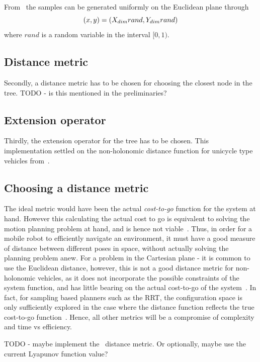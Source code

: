 From~\cite{kuffnerEffectiveSamplingDistance2004} the samples can be generated
uniformly on the Euclidean plane through
\[
  (x,y) = (\mathnormal{X}_{dim}rand, \mathnormal{Y}_{dim}rand)
\]
where \(rand\) is a random variable in the interval \([0,1)\).

\subsection{Distance metric}

Secondly, a distance metric has to be chosen for choosing the closest node in
the tree. TODO - is this mentioned in the preliminaries?

\subsection{Extension operator}

Thirdly, the extension operator for the tree has to be chosen. This
implementation settled on the non-holonomic distance function for unicycle type
vehicles from~\cite{parkFeedbackMotionPlanning2015}.

\subsection{Choosing a distance metric}

The ideal metric would have been the actual \textit{cost-to-go} function for the
system at hand. However this calculating the actual cost to go is equivalent to
solving the motion planning problem at hand, and is hence not
viable~\cite{pengchengReducingMetricSensitivity2001}. Thus, in order for a
mobile robot to efficiently navigate an environment, it must have a good measure
of distance between different poses in space, without actually solving the
planning problem anew. For a problem in the Cartesian plane - it is common to
use the Euclidean distance, however, this is not a good distance metric for
non-holonomic vehicles, as it does not incorporate the possible constraints of
the system function, and has little bearing on the actual cost-to-go of the
system~\cite{parkFeedbackMotionPlanning2015}. In fact, for sampling based
planners such as the \ac{RRT}, the configuration space is only sufficiently
explored in the case where the distance function reflects the true cost-to-go
function~\cite{pengchengReducingMetricSensitivity2001}. Hence, all other metrics
will be a compromise of complexity and time vs efficiency.

TODO - maybe implement the~\cite{parkFeedbackMotionPlanning2015} distance
metric. Or optionally, maybe use the current Lyapunov function value?

